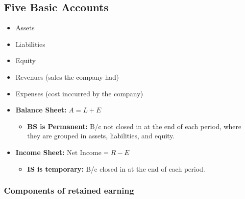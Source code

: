 \subsection{Five Basic Accounts}
\begin{definition}
    \begin{itemize}
        \item Assets
        \item Liabilities
        \item Equity
        \item Revenues (sales the company had)
        \item Expenses (cost inccurred by the company)
    \end{itemize}
    \begin{itemize}
        \item \textbf{Balance Sheet:} $A = L + E$
        \begin{itemize}
            \item \textbf{BS is Permanent:} B/c not closed in at the end of each period, where they are grouped in assets, liabilities, and equity.
        \end{itemize}
        \item \textbf{Income Sheet:} $\text{Net Income} = R - E$
        \begin{itemize}
            \item \textbf{IS is temporary:} B/c closed in at the end of each period.
        \end{itemize}
    \end{itemize}
\end{definition}

\subsubsection{Components of retained earning}
\begin{definition}
\end{definition}

